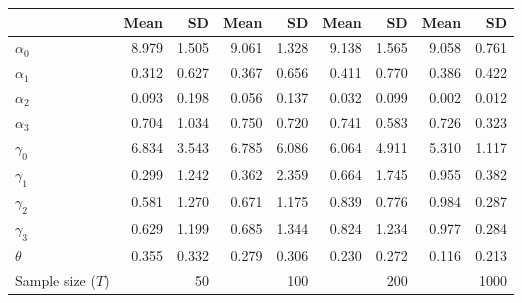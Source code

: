 
\begin{tabular}[t]{lrrrrrrrr}
\toprule
  & Mean & SD & Mean  & SD  & Mean   & SD   & Mean    & SD   \\
\midrule
$\alpha_{0}$ & 8.979 & 1.505 & 9.061 & 1.328 & 9.138 & 1.565 & 9.058 & 0.761\\
$\alpha_{1}$ & 0.312 & 0.627 & 0.367 & 0.656 & 0.411 & 0.770 & 0.386 & 0.422\\
$\alpha_{2}$ & 0.093 & 0.198 & 0.056 & 0.137 & 0.032 & 0.099 & 0.002 & 0.012\\
$\alpha_{3}$ & 0.704 & 1.034 & 0.750 & 0.720 & 0.741 & 0.583 & 0.726 & 0.323\\
$\gamma_{0}$ & 6.834 & 3.543 & 6.785 & 6.086 & 6.064 & 4.911 & 5.310 & 1.117\\
$\gamma_{1}$ & 0.299 & 1.242 & 0.362 & 2.359 & 0.664 & 1.745 & 0.955 & 0.382\\
$\gamma_{2}$ & 0.581 & 1.270 & 0.671 & 1.175 & 0.839 & 0.776 & 0.984 & 0.287\\
$\gamma_{3}$ & 0.629 & 1.199 & 0.685 & 1.344 & 0.824 & 1.234 & 0.977 & 0.284\\
$\theta$ & 0.355 & 0.332 & 0.279 & 0.306 & 0.230 & 0.272 & 0.116 & 0.213\\
Sample size ($T$) &  & 50 &  & 100 &  & 200 &  & 1000\\
\bottomrule
\end{tabular}
